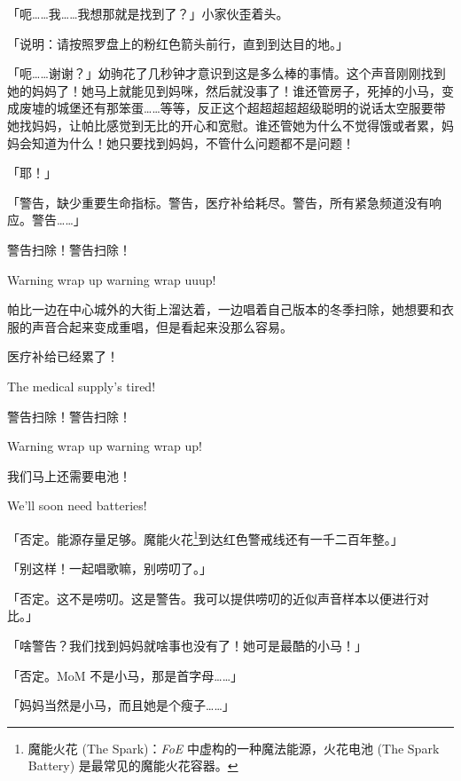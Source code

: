 「呃……我……我想那就是找到了？」小家伙歪着头。

「{\mt 说明：请按照罗盘上的粉红色箭头前行，直到到达目的地。}」

「呃……谢谢？」幼驹花了几秒钟才意识到这是多么棒的事情。这个声音刚刚找到她的妈妈了！她马上就能见到妈咪，然后就没事了！谁还管房子，死掉的小马，变成废墟的城堡还有那笨蛋……等等，反正这个超超超超超级聪明的说话太空服要带她找妈妈，让帕比感觉到无比的开心和宽慰。谁还管她为什么不觉得饿或者累，妈妈会知道为什么！她只要找到妈妈，不管什么问题都不是问题！

「耶！」

\horizonline


「{\mt 警告，缺少重要生命指标。警告，医疗补给耗尽。警告，所有紧急频道没有响应。警告……}」

\begin{song}
警告扫除！警告扫除！

Warning wrap up warning wrap uuup!
\end{song}

帕比一边在中心城外的大街上溜达着，一边唱着自己版本的冬季扫除，她想要和衣服的声音合起来变成重唱，但是看起来没那么容易。

\begin{song}
医疗补给已经累了！

The medical supply's tired!

\medskip

警告扫除！警告扫除！

Warning wrap up warning wrap up!

\medskip

我们马上还需要电池！

We'll soon need batteries!
\end{song}

「{\mt 否定。能源存量足够。魔能火花\footnote{魔能火花 (The Spark)：\emph{FoE} 中虚构的一种魔法能源，火花电池 (The Spark Battery) 是最常见的魔能火花容器。}到达红色警戒线还有一千二百年整。}」

「别这样！一起唱歌嘛，别唠叨了。」

「{\mt 否定。这不是唠叨。这是警告。我可以提供唠叨的近似声音样本以便进行对比。}」

「啥警告？我们找到妈妈就啥事也没有了！她可是最酷的小马！」

「{\mt 否定。MoM 不是小马，那是首字母……}」

「妈妈当然是小马，而且她是个瘦子……」

